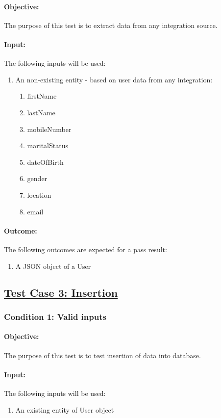 \documentclass{article}
\begin{document}
\paragraph{Objective:} The purpose of this test is to extract data from any integration source.
\paragraph{Input:} The following inputs will be used:
\begin{enumerate}
	\item An non-existing entity - based on user data from any integration:
	\begin{enumerate}
		\item firstName
  		\item lastName
  		\item mobileNumber 
  		\item maritalStatus 
  		\item dateOfBirth 
 		\item gender
  		\item location 
 		\item email	
	\end{enumerate}
\end{enumerate}
\paragraph{Outcome:} The following outcomes are expected for a pass result:
\begin{enumerate}
	\item A JSON object of a User 
\end{enumerate}

\subsection{\underline{Test Case 3: Insertion}}\label{test3}
\subsubsection{Condition 1: Valid inputs }
\paragraph{Objective:} The purpose of this test is to test insertion of data into database.
\paragraph{Input:} The following inputs will be used:
\begin{enumerate}
	\item An existing entity of User object
\end{enumerate}
\end{document}
